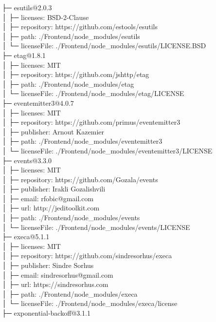 ├─ esutils@2.0.3\\
│  ├─ licenses: BSD-2-Clause\\
│  ├─ repository: https://github.com/estools/esutils\\
│  ├─ path: ./Frontend/node\_modules/esutils\\
│  └─ licenseFile: ./Frontend/node\_modules/esutils/LICENSE.BSD\\
├─ etag@1.8.1\\
│  ├─ licenses: MIT\\
│  ├─ repository: https://github.com/jshttp/etag\\
│  ├─ path: ./Frontend/node\_modules/etag\\
│  └─ licenseFile: ./Frontend/node\_modules/etag/LICENSE\\
├─ eventemitter3@4.0.7\\
│  ├─ licenses: MIT\\
│  ├─ repository: https://github.com/primus/eventemitter3\\
│  ├─ publisher: Arnout Kazemier\\
│  ├─ path: ./Frontend/node\_modules/eventemitter3\\
│  └─ licenseFile: ./Frontend/node\_modules/eventemitter3/LICENSE\\
├─ events@3.3.0\\
│  ├─ licenses: MIT\\
│  ├─ repository: https://github.com/Gozala/events\\
│  ├─ publisher: Irakli Gozalishvili\\
│  ├─ email: rfobic@gmail.com\\
│  ├─ url: http://jeditoolkit.com\\
│  ├─ path: ./Frontend/node\_modules/events\\
│  └─ licenseFile: ./Frontend/node\_modules/events/LICENSE\\
├─ execa@5.1.1\\
│  ├─ licenses: MIT\\
│  ├─ repository: https://github.com/sindresorhus/execa\\
│  ├─ publisher: Sindre Sorhus\\
│  ├─ email: sindresorhus@gmail.com\\
│  ├─ url: https://sindresorhus.com\\
│  ├─ path: ./Frontend/node\_modules/execa\\
│  └─ licenseFile: ./Frontend/node\_modules/execa/license\\
├─ exponential-backoff@3.1.1\\
